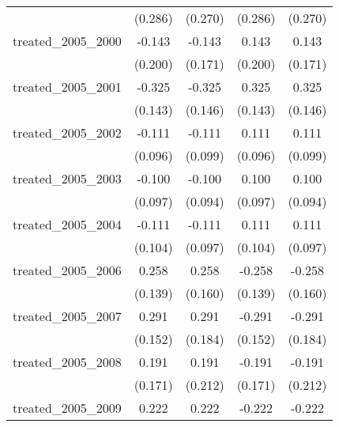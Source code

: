 {\begin{tabular}{l*{4}{c}}
            &     (0.286)         &     (0.270)         &     (0.286)         &     (0.270)         \\
[1em]
treated\_2005\_2000&      -0.143         &      -0.143         &       0.143         &       0.143         \\
            &     (0.200)         &     (0.171)         &     (0.200)         &     (0.171)         \\
[1em]
treated\_2005\_2001&      -0.325\sym{*}  &      -0.325\sym{*}  &       0.325\sym{*}  &       0.325\sym{*}  \\
            &     (0.143)         &     (0.146)         &     (0.143)         &     (0.146)         \\
[1em]
treated\_2005\_2002&      -0.111         &      -0.111         &       0.111         &       0.111         \\
            &     (0.096)         &     (0.099)         &     (0.096)         &     (0.099)         \\
[1em]
treated\_2005\_2003&      -0.100         &      -0.100         &       0.100         &       0.100         \\
            &     (0.097)         &     (0.094)         &     (0.097)         &     (0.094)         \\
[1em]
treated\_2005\_2004&      -0.111         &      -0.111         &       0.111         &       0.111         \\
            &     (0.104)         &     (0.097)         &     (0.104)         &     (0.097)         \\
[1em]
treated\_2005\_2006&       0.258         &       0.258         &      -0.258         &      -0.258         \\
            &     (0.139)         &     (0.160)         &     (0.139)         &     (0.160)         \\
[1em]
treated\_2005\_2007&       0.291         &       0.291         &      -0.291         &      -0.291         \\
            &     (0.152)         &     (0.184)         &     (0.152)         &     (0.184)         \\
[1em]
treated\_2005\_2008&       0.191         &       0.191         &      -0.191         &      -0.191         \\
            &     (0.171)         &     (0.212)         &     (0.171)         &     (0.212)         \\
[1em]
treated\_2005\_2009&       0.222         &       0.222         &      -0.222         &      -0.222         \\

\end{tabular}}
